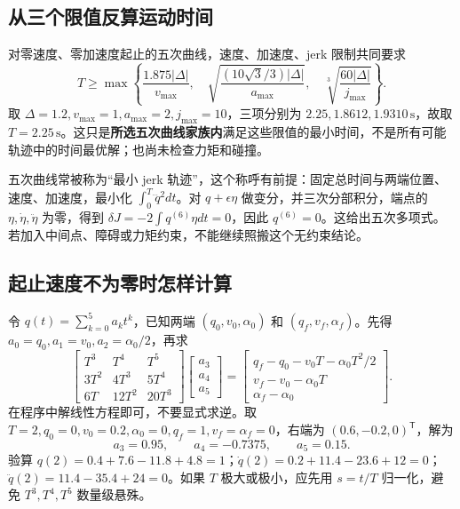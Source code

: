 \subsection{从三个限值反算运动时间}

对零速度、零加速度起止的五次曲线，速度、加速度、jerk 限制共同要求
\begin{equation}
T\ge\max\left\{
\frac{1.875|\Delta|}{v_{\max}},\quad
\sqrt{\frac{(10\sqrt3/3)|\Delta|}{a_{\max}}},\quad
\sqrt[3]{\frac{60|\Delta|}{j_{\max}}}\right\}.
\end{equation}
取 $\Delta=1.2,v_{\max}=1,a_{\max}=2,j_{\max}=10$，三项分别为 $2.25,1.8612,1.9310\,\mathrm{s}$，故取 $T=2.25\,\mathrm{s}$。这只是\textbf{所选五次曲线家族内}满足这些限值的最小时间，不是所有可能轨迹中的时间最优解；也尚未检查力矩和碰撞。

五次曲线常被称为“最小 jerk 轨迹”，这个称呼有前提：固定总时间与两端位置、速度、加速度，最小化 $\int_0^T\dddot q^2dt$。对 $q+\epsilon\eta$ 做变分，并三次分部积分，端点的 $\eta,\dot\eta,\ddot\eta$ 为零，得到 $\delta J=-2\int q^{(6)}\eta dt=0$，因此 $q^{(6)}=0$。这给出五次多项式。若加入中间点、障碍或力矩约束，不能继续照搬这个无约束结论。

\subsection{起止速度不为零时怎样计算}

令 $q(t)=\sum_{k=0}^{5}a_kt^k$，已知两端 $(q_0,v_0,\alpha_0)$ 和 $(q_f,v_f,\alpha_f)$。先得 $a_0=q_0,a_1=v_0,a_2=\alpha_0/2$，再求
\begin{equation}
\begin{bmatrix}T^3&T^4&T^5\\3T^2&4T^3&5T^4\\6T&12T^2&20T^3\end{bmatrix}
\begin{bmatrix}a_3\\a_4\\a_5\end{bmatrix}
=\begin{bmatrix}
q_f-q_0-v_0T-\alpha_0T^2/2\\
v_f-v_0-\alpha_0T\\
\alpha_f-\alpha_0
\end{bmatrix}.
\end{equation}
在程序中解线性方程即可，不要显式求逆。取 $T=2,q_0=0,v_0=0.2,\alpha_0=0,q_f=1,v_f=\alpha_f=0$，右端为 $(0.6,-0.2,0)^\mathsf T$，解为
\[
a_3=0.95,\qquad a_4=-0.7375,\qquad a_5=0.15.
\]
验算 $q(2)=0.4+7.6-11.8+4.8=1$；$\dot q(2)=0.2+11.4-23.6+12=0$；$\ddot q(2)=11.4-35.4+24=0$。如果 $T$ 极大或极小，应先用 $s=t/T$ 归一化，避免 $T^3,T^4,T^5$ 数量级悬殊。

